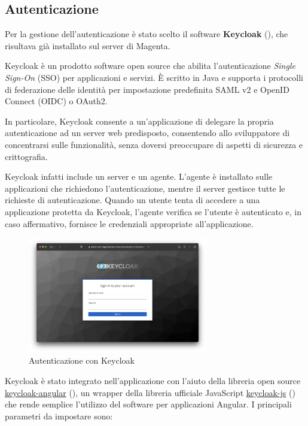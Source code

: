 \subsection{Autenticazione}\label{sec:autenticazione}
Per la gestione dell'autenticazione è stato scelto il software \textbf{Keycloak} (\cite{keycloak}), che risultava già installato sul server di Magenta.

Keycloak è un prodotto software open source che abilita l'autenticazione \textit{Single Sign-On} (SSO) per applicazioni e servizi. È scritto in Java e supporta i protocolli di federazione delle identità per impostazione predefinita SAML v2 e OpenID Connect (OIDC) o OAuth2. \cite{keycloak}

In particolare, Keycloak consente a un'applicazione di delegare la propria autenticazione ad un server web predisposto, consentendo allo sviluppatore di concentrarsi sulle funzionalità, senza doversi preoccupare di aspetti di sicurezza e crittografia.

Keycloak infatti include un server e un agente. L'agente è installato sulle applicazioni che richiedono l'autenticazione, mentre il server gestisce tutte le richieste di autenticazione. Quando un utente tenta di accedere a una applicazione protetta da Keycloak, l'agente verifica se l'utente è autenticato e, in caso affermativo, fornisce le credenziali appropriate all'applicazione.

\begin{figure}[H]
\centering
\includegraphics[width=0.70\textwidth,height=\textheight,keepaspectratio]{img/keycloak}
\caption{Autenticazione con Keycloak}
\label{fig:keycloak}
\end{figure}

Keycloak è stato integrato nell'applicazione con l'aiuto della libreria open source \url{keycloak-angular} (\cite{keycloak-angular}), un wrapper della libreria ufficiale JavaScript \url{keycloak-js} (\cite{keycloak-js}) che rende semplice l'utilizzo del software per applicazioni Angular. I principali parametri da impostare sono:

